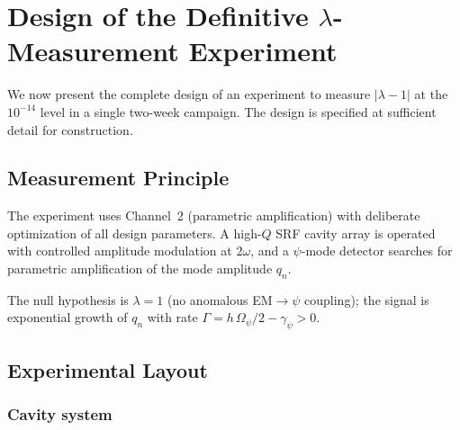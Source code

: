 \documentclass[aps,prd,twocolumn,superscriptaddress,floatfix,nofootinbib]{revtex4-2}
\newcommand{\Opsi}{\Omega_\psi}
\newcommand{\gpsi}{\gamma_\psi}
\begin{document}
\section{Design of the Definitive $\lambda$-Measurement
Experiment}\label{sec:experiment-design}

We now present the complete design of an experiment to measure
$|\lambda - 1|$ at the $10^{-14}$ level in a single two-week campaign.
The design is specified at sufficient detail for construction.

\subsection{Measurement Principle}\label{sec:principle}

The experiment uses Channel~2 (parametric amplification) with
deliberate optimization of all design parameters. A high-$Q$ SRF
cavity array is operated with controlled amplitude modulation at
$2\omega$, and a $\psi$-mode detector searches for parametric
amplification of the mode amplitude $q_n$.

The null hypothesis is $\lambda = 1$ (no anomalous EM$\to\psi$ coupling);
the signal is exponential growth of $q_n$ with rate
$\Gamma = h\,\Opsi/2 - \gpsi > 0$.

\subsection{Experimental Layout}\label{sec:layout}

\subsubsection{Cavity system}
\end{document}
